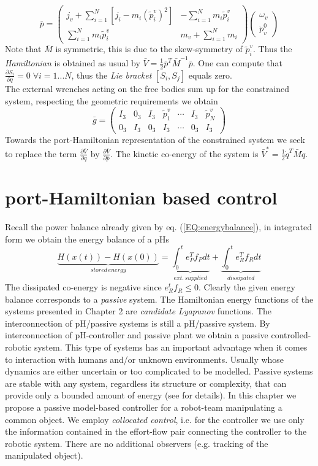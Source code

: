\documentclass[a4paper,twoside, openright,12pt]{report}
\begin{document}
\[\bar{p} = \begin{pmatrix}
j_v+\sum_{i=1}^N [j_i - m_i(\tilde{p}_i^v)^2] & -\sum_{i=1}^N m_i\tilde{p}_i^v \\ \sum_{i=1}^N m_i\tilde{p}_i^v & m_v + \sum_{i=1}^N m_i
\end{pmatrix}  \begin{pmatrix}
\omega_v \\ \dot{p}_v^0
\end{pmatrix} \]
Note that $\bar{M}$ is symmetric, this is due to the skew-symmetry of $ \tilde{p}_i^v $.
Thus the \emph{Hamiltonian} is obtained as usual by $\bar{V} =  \frac{1}{2}\bar{p}^T\bar{M}^{-1}\bar{p}$.
One can compute that $\frac{\partial S_i}{\partial q} = 0 \; \forall i=1...N$, thus the \emph{Lie bracket} $[S_i,S_j]$ equals zero.\\
The external wrenches acting on the free bodies sum up for the constrained system, respecting the geometric requirements we obtain
\[ \bar{g} = \begin{pmatrix}
I_3 & 0_3 & I_3 & \tilde{p}_1^v & \cdots & I_3 & \tilde{p}_N^v \\0_3 & I_3 & 0_3 & I_3 & \cdots & 0_3 & I_3
\end{pmatrix} \]
Towards the port-Hamiltonian representation of the constrained system we seek to replace the term $ \frac{\partial \bar{V}}{\partial q} $ by $ \frac{\partial \bar{V}}{\partial \bar{p}} $. The kinetic co-energy of the system is $\bar{V}^* =\frac{1}{2} \dot{q}^T \bar{M} \dot{q}$.


\chapter{port-Hamiltonian based control}
Recall the power balance already given by eq. (\ref{EQ:energybalance}), in integrated form we obtain the energy balance of a pHs
\begin{equation}
\underbrace{H(x(t))-H(x(0))}_{stored\, energy} = \underbrace{\int_0^t e_P^Tf_P dt}_{ext.\, supplied} + \underbrace{\int_0^te_R^Tf_R dt}_{dissipated} 
\end{equation}
The dissipated co-energy is negative since $e_R^tf_R \leq 0$. Clearly the given energy balance corresponds to a \emph{passive} system. The Hamiltonian energy functions of the systems presented in Chapter 2 are \emph{candidate Lyapunov} functions. The interconnection of pH/passive systems is still a pH/passive system. By interconnection of pH-controller and passive plant we obtain a passive controlled-robotic system. This type of systems has an important advantage when it comes to interaction with humans and/or unknown environments. Usually whose dynamics are either uncertain or too complicated to be modelled. Passive systems are stable with any system, regardless its structure or complexity, that can provide only a bounded amount of energy (see \cite{Stramigioli_15} for details). In this chapter we propose a passive model-based controller for a robot-team manipulating a common object. We employ \emph{collocated control}, i.e. for the controller we use only the information contained in the effort-flow pair connecting the controller to the robotic system. There are no additional observers (e.g. tracking of the manipulated object).
\end{document}
